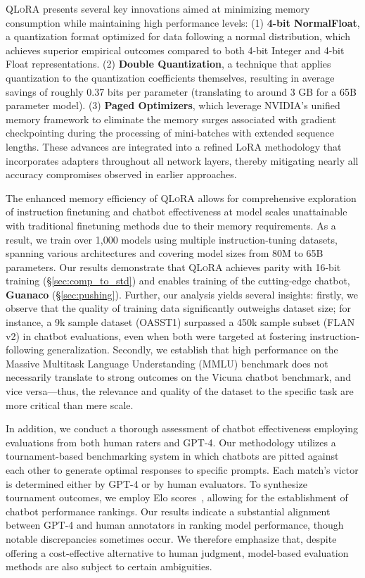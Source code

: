 \textsc{QLoRA} presents several key innovations aimed at minimizing memory consumption while maintaining high performance levels: (1) \textbf{4-bit NormalFloat}, a quantization format optimized for data following a normal distribution, which achieves superior empirical outcomes compared to both 4-bit Integer and 4-bit Float representations. (2) \textbf{Double Quantization}, a technique that applies quantization to the quantization coefficients themselves, resulting in average savings of roughly 0.37 bits per parameter (translating to around 3 GB for a 65B parameter model). (3) \textbf{Paged Optimizers}, which leverage NVIDIA's unified memory framework to eliminate the memory surges associated with gradient checkpointing during the processing of mini-batches with extended sequence lengths. These advances are integrated into a refined LoRA methodology that incorporates adapters throughout all network layers, thereby mitigating nearly all accuracy compromises observed in earlier approaches.

The enhanced memory efficiency of \textsc{QLoRA} allows for comprehensive exploration of instruction finetuning and chatbot effectiveness at model scales unattainable with traditional finetuning methods due to their memory requirements. As a result, we train over 1,000 models using multiple instruction-tuning datasets, spanning various architectures and covering model sizes from 80M to 65B parameters. Our results demonstrate that \textsc{QLoRA} achieves parity with 16-bit training (\S\ref{sec:comp_to_std}) and enables training of the cutting-edge chatbot, \textbf{Guanaco} (\S\ref{sec:pushing}). Further, our analysis yields several insights: firstly, we observe that the quality of training data significantly outweighs dataset size; for instance, a 9k sample dataset (OASST1) surpassed a 450k sample subset (FLAN v2) in chatbot evaluations, even when both were targeted at fostering instruction-following generalization. Secondly, we establish that high performance on the Massive Multitask Language Understanding (MMLU) benchmark does not necessarily translate to strong outcomes on the Vicuna chatbot benchmark, and vice versa—thus, the relevance and quality of the dataset to the specific task are more critical than mere scale.

In addition, we conduct a thorough assessment of chatbot effectiveness employing evaluations from both human raters and GPT-4. Our methodology utilizes a tournament-based benchmarking system in which chatbots are pitted against each other to generate optimal responses to specific prompts. Each match’s victor is determined either by GPT-4 or by human evaluators. To synthesize tournament outcomes, we employ Elo scores~\citep{elo1967proposed, elo1978rating}, allowing for the establishment of chatbot performance rankings. Our results indicate a substantial alignment between GPT-4 and human annotators in ranking model performance, though notable discrepancies sometimes occur. We therefore emphasize that, despite offering a cost-effective alternative to human judgment, model-based evaluation methods are also subject to certain ambiguities.

